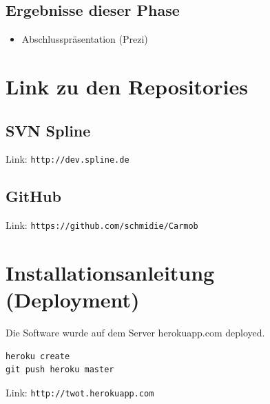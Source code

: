 \documentclass{article}
\begin{document}
\subsection{Ergebnisse dieser Phase}

\begin{itemize}
\item Abschlusspr\"asentation (Prezi)
\end{itemize}

\section{Link zu den Repositories}

\subsection{SVN Spline}

Link: \texttt{http://dev.spline.de}

\subsection{GitHub}

Link: \texttt{https://github.com/schmidie/Carmob}

\section{Installationsanleitung (Deployment)}

Die Software wurde auf dem Server herokuapp.com deployed.

\begin{verbatim}
heroku create
git push heroku master
\end{verbatim}

Link: \texttt{http://twot.herokuapp.com}
\end{document}
